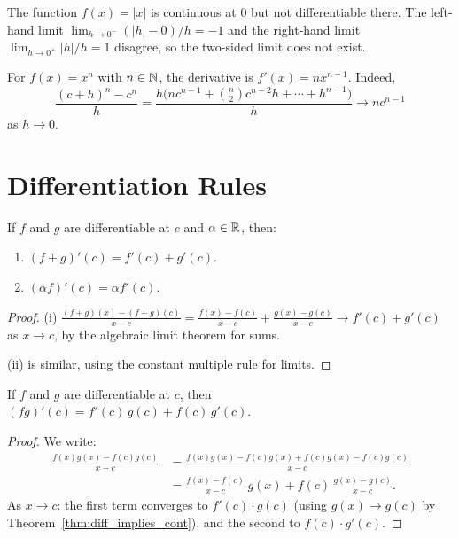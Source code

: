 \documentclass[11pt,a4paper]{article}
\begin{document}
\begin{example}
\label{ex:abs_not_diff}
The function $f(x) = |x|$ is continuous at $0$ but not differentiable
there. The left-hand limit $\lim_{h \to 0^-} (|h| - 0)/h = -1$ and the
right-hand limit $\lim_{h \to 0^+} |h|/h = 1$ disagree, so the
two-sided limit does not exist.
\end{example}

\begin{example}
\label{ex:power_rule}
For $f(x) = x^n$ with $n \in \mathbb{N}$, the derivative is $f'(x) = nx^{n-1}$.
Indeed,
\[
  \frac{(c+h)^n - c^n}{h}
  = \frac{h\bigl(nc^{n-1} + \binom{n}{2}c^{n-2}h + \cdots + h^{n-1}\bigr)}{h}
  \to nc^{n-1}
\]
as $h \to 0$.
\end{example}

\section{Differentiation Rules}
\label{sec:diff_rules}

\begin{theorem}
\label{thm:sum_rule}
If $f$ and $g$ are differentiable at $c$ and $\alpha \in \mathbb{R}$, then:
\begin{enumerate}[nosep,label=(\roman*)]
  \item $(f + g)'(c) = f'(c) + g'(c)$.
  \item $(\alpha f)'(c) = \alpha f'(c)$.
\end{enumerate}
\end{theorem}

\begin{proof}
(i) $\displaystyle\frac{(f+g)(x) - (f+g)(c)}{x - c}
= \frac{f(x) - f(c)}{x - c} + \frac{g(x) - g(c)}{x - c}
\to f'(c) + g'(c)$ as $x \to c$, by the algebraic limit theorem for
sums.

(ii) is similar, using the constant multiple rule for limits.
\end{proof}

\begin{theorem}
\label{thm:product_rule}
If $f$ and $g$ are differentiable at $c$, then
$(fg)'(c) = f'(c)\,g(c) + f(c)\,g'(c)$.
\end{theorem}

\begin{proof}
We write:
\begin{align*}
  \frac{f(x)g(x) - f(c)g(c)}{x - c}
  &= \frac{f(x)g(x) - f(c)g(x) + f(c)g(x) - f(c)g(c)}{x - c} \\
  &= \frac{f(x) - f(c)}{x - c}\,g(x) + f(c)\,\frac{g(x) - g(c)}{x - c}.
\end{align*}
As $x \to c$: the first term converges to $f'(c) \cdot g(c)$ (using
$g(x) \to g(c)$ by Theorem~\ref{thm:diff_implies_cont}), and the second
to $f(c) \cdot g'(c)$.
\end{proof}
\end{document}
